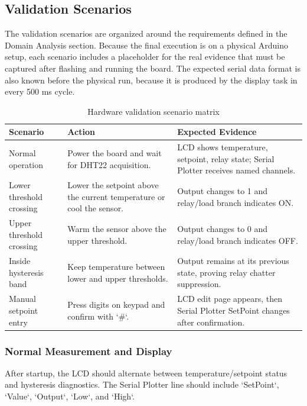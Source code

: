 \subsection{Validation Scenarios}

The validation scenarios are organized around the requirements defined in the Domain Analysis section. Because the final execution is on a physical Arduino setup, each scenario includes a placeholder for the real evidence that must be captured after flashing and running the board. The expected serial data format is also known before the physical run, because it is produced by the display task in every 500 ms cycle.

\begin{table}[H]
\centering
\begin{tabular}{|p{3.3cm}|p{5.0cm}|p{5.3cm}|}
\hline
\textbf{Scenario} & \textbf{Action} & \textbf{Expected Evidence} \\
\hline
Normal operation & Power the board and wait for DHT22 acquisition. & LCD shows temperature, setpoint, relay state; Serial Plotter receives named channels. \\
\hline
Lower threshold crossing & Lower the setpoint above the current temperature or cool the sensor. & Output changes to 1 and relay/load branch indicates ON. \\
\hline
Upper threshold crossing & Warm the sensor above the upper threshold. & Output changes to 0 and relay/load branch indicates OFF. \\
\hline
Inside hysteresis band & Keep temperature between lower and upper thresholds. & Output remains at its previous state, proving relay chatter suppression. \\
\hline
Manual setpoint entry & Press digits on keypad and confirm with `\#`. & LCD edit page appears, then Serial Plotter SetPoint changes after confirmation. \\
\hline
\end{tabular}
\caption{Hardware validation scenario matrix}
\label{tab:validation_scenarios}
\end{table}

\subsubsection{Normal Measurement and Display}

After startup, the LCD should alternate between temperature/setpoint status and hysteresis diagnostics. The Serial Plotter line should include `SetPoint`, `Value`, `Output`, `Low`, and `High`.


